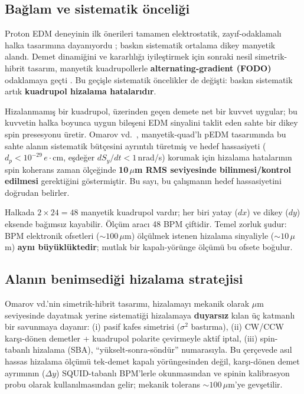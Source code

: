 \documentclass[twocolumn,a4paper,10pt]{article}
\begin{document}
\subsection{Bağlam ve sistematik önceliği}

Proton EDM deneyinin ilk önerileri tamamen elektrostatik, zayıf-odaklamalı
halka tasarımına dayanıyordu \cite{anastassopoulos2016}; baskın sistematik
ortalama dikey manyetik alandı. Demet dinamiğini ve kararlılığı iyileştirmek için sonraki nesil
simetrik-hibrit tasarım, manyetik kuadrupollerle \textbf{alternating-gradient
(FODO)} odaklamaya geçti \cite{omarov2022}. Bu geçişle sistematik öncelikler
de değişti: baskın sistematik artık \textbf{kuadrupol hizalama hatalarıdır}.

Hizalanmamış bir kuadrupol, üzerinden geçen demete net bir kuvvet uygular; bu
kuvvetin halka boyunca uygun bileşeni EDM sinyalini taklit eden sahte bir
dikey spin presesyonu üretir. Omarov vd.\ \cite{omarov2022}, manyetik-quad'lı
pEDM tasarımında bu sahte alanın sistematik bütçesini ayrıntılı türetmiş ve
hedef hassasiyeti ($d_p < 10^{-29}\,e\cdot$cm, eşdeğer $dS_y/dt < 1$\,nrad/s)
korumak için hizalama hatalarının spin koherans zaman ölçeğinde
\textbf{10\,$\mu$m RMS seviyesinde bilinmesi/kontrol edilmesi} gerektiğini
göstermiştir. Bu sayı, bu çalışmanın hedef hassasiyetini doğrudan belirler.

Halkada $2\times 24 = 48$ manyetik kuadrupol vardır; her biri yatay ($dx$) ve
dikey ($dy$) eksende bağımsız kayabilir. Ölçüm aracı 48 BPM çiftidir. Temel
zorluk şudur: BPM elektronik ofsetleri ($\sim 100\,\mu$m) ölçülmek istenen
hizalama sinyaliyle ($\sim 10\,\mu$m) \textbf{aynı büyüklüktedir}; mutlak bir
kapalı-yörünge ölçümü bu ofsete boğulur.

\subsection{Alanın benimsediği hizalama stratejisi}

Omarov vd.'nin simetrik-hibrit tasarımı, hizalamayı mekanik olarak $\mu$m
seviyesinde dayatmak yerine sistematiği hizalamaya \textbf{duyarsız} kılan üç
katmanlı bir savunmaya dayanır: (i) pasif kafes simetrisi ($\sigma^2$
bastırma), (ii) CW/CCW karşı-dönen demetler + kuadrupol polarite çevirmeyle
aktif iptal, (iii) spin-tabanlı hizalama (SBA), ``yükselt-sonra-söndür''
numarasıyla. Bu çerçevede asıl hassas hizalama ölçümü tek-demet kapalı
yörüngesinden değil, karşı-dönen demet ayrımının ($\Delta y$) SQUID-tabanlı
BPM'lerle okunmasından ve spinin kalibrasyon probu olarak kullanılmasından
gelir; mekanik tolerans $\sim 100\,\mu$m'ye gevşetilir.
\end{document}
